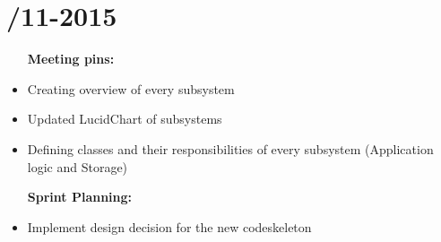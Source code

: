\section{/11-2015} %
\attend{\at}{\at}{\nat}{\at}


\begin{itemize}
	\item [\textbf{Meeting pins:}]
	\item Creating overview of every subsystem
	\item Updated LucidChart of subsystems
	\item Defining classes and their responsibilities of every subsystem (Application logic and Storage)
\end{itemize}

\begin{itemize}
	\item [\textbf{Sprint Planning:}]
	\item Implement design decision for the new codeskeleton
\end{itemize}